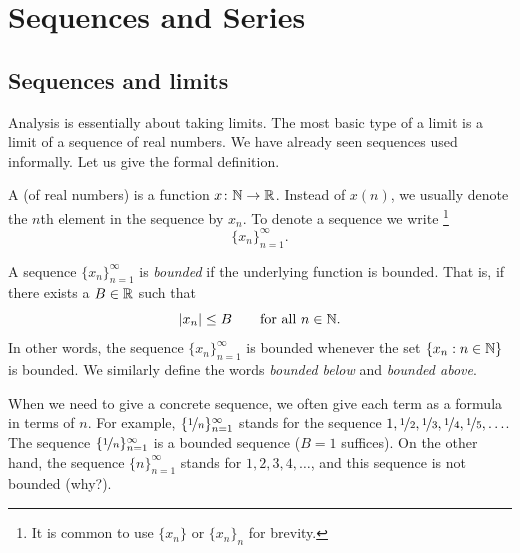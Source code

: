 \chapter{Sequences and Series} \label{seq:chapter}


\section{Sequences and limits}
\label{sec:seqsandlims}



Analysis is essentially about taking limits.  The most basic type of a limit
is a limit of a sequence of real numbers.
We have already seen sequences used informally.  Let us give the formal
definition.

\begin{defn}
A \emph{} (of real numbers) is a function $x \colon {\mathbb{N}} \to
{\mathbb{R}}$.  Instead of $x(n)$, we 
usually denote the $n$th element in the sequence by $x_n$.
To denote a sequence we write%
\footnote{It is common to use $\{ x_n \}$ or $\{ x_n \}_n$ for brevity.}%
%
\begin{equation*}
\{ x_n \}_{n=1}^\infty.
\end{equation*}

A sequence $\{ x_n \}_{n=1}^\infty$ is \emph{bounded} if
the underlying function is bounded.  That is, if
there exists a $B \in {\mathbb{R}}$ such that
\begin{equation*}
\left\lvert {x_n} \right\rvert \leq B \qquad \text{for all } n \in {\mathbb{N}}.
\end{equation*}
In other words, the sequence $\{x_n\}_{n=1}^\infty$ is bounded whenever
the set $\{ x_n : n \in {\mathbb{N}} \}$
is bounded.
We similarly define the words
\emph{bounded below} and
\emph{bounded above}.
\end{defn}

When we need
to give a concrete sequence, we often give each term as a formula in
terms of $n$.
For example, $\{ \nicefrac{1}{n} \}_{n=1}^\infty$ stands for
the sequence $1, \nicefrac{1}{2}, \nicefrac{1}{3}, \nicefrac{1}{4},
\nicefrac{1}{5}, \ldots$.
The sequence $\{ \nicefrac{1}{n} \}_{n=1}^\infty$
is a bounded sequence ($B=1$ suffices).  On the other hand, the sequence
$\{ n \}_{n=1}^\infty$ stands for
$1,2,3,4,\ldots$, and this sequence is not bounded (why?).


